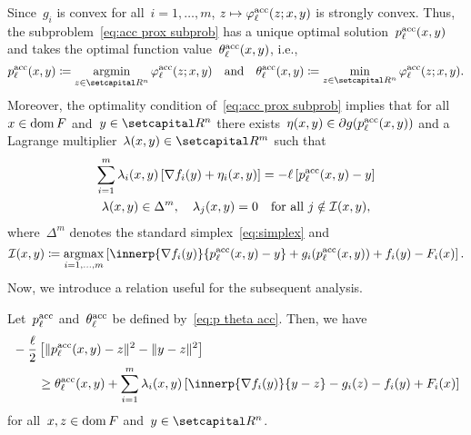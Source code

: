 \documentclass[../main]{subfiles}
\begin{document}
Since~$g_i$ is convex for all~$i = 1, \dots, m$, $z \mapsto \varphi^{\mathrm{acc}}_\ell(z; x, y)$ is strongly convex.
Thus, the subproblem~\cref{eq:acc prox subprob} has a unique optimal solution~$p^{\mathrm{acc}}_\ell(x, y)$ and takes the optimal function value~$\theta^{\mathrm{acc}}_\ell(x, y)$, i.e.,
\[ \label{eq:p theta acc}
    p^\acc_\ell(x, y) \coloneqq \argmin_{z \in \setR^n} \varphi^\acc_\ell(z; x, y) \eqand \theta^\acc_\ell(x, y) \coloneqq \min_{z \in \setR^n} \varphi^\acc_\ell(z; x, y)
.\]
Moreover, the optimality condition of~\cref{eq:acc prox subprob} implies that for all $x \in \operatorname{dom} F$ and~$y \in \setR^n$ there exists~$\eta(x, y) \in \partial g(p^{\mathrm{acc}}_\ell(x, y))$ and a Lagrange multiplier~$\lambda(x, y) \in \setR^m$ such that
\begin{subequations} \label{eq:kkt}
    \begin{gather} 
        \sum_{i = 1}^m \lambda_i(x, y) \left[ \nabla f_i(y) + \eta_i(x, y) \right] = - \ell \left[ p^{\mathrm{acc}}_\ell(x, y) - y \right] \label{eq:optimal} \\
        \lambda(x, y) \in \Delta^m, \quad \lambda_j(x, y) = 0 \quad \text{for all~$j \notin \mathcal{I}(x, y)$} \label{eq:lambda}
    ,\end{gather}
\end{subequations}
where~$\Delta^m$ denotes the standard simplex~\cref{eq:simplex} and
\[ \label{eq:I}
    \mathcal{I}(x, y) \coloneqq \argmax_{i = 1, \dots, m} \left[ \innerp{\nabla f_i(y)}{p^\acc_\ell(x, y) - y} + g_i(p^\acc_\ell(x, y)) + f_i(y) - F_i(x) \right]
.\]
Now, we introduce a relation useful for the subsequent analysis.
\begin{lemma} \label{thm:useful relation}
    Let~$p^{\mathrm{acc}}_\ell$ and~$\theta^{\mathrm{acc}}_\ell$ be defined by~\cref{eq:p theta acc}.
    Then, we have
    \begin{align}
        \MoveEqLeft - \frac{\ell}{2} \left[ \norm{p^\acc_\ell(x, y) - z}^2 - \norm{y - z}^2 \right] \\
        &\ge \theta^\acc_\ell(x, y) + \sum_{i = 1}^{m} \lambda_i(x, y) \left[ \innerp{\nabla f_i(y)}{y - z} - g_i(z) - f_i(y) + F_i(x) \right] 
    \end{align}
    for all~$x, z \in \operatorname{dom} F$ and~$y \in \setR^n$.
\end{lemma}
\end{document}
